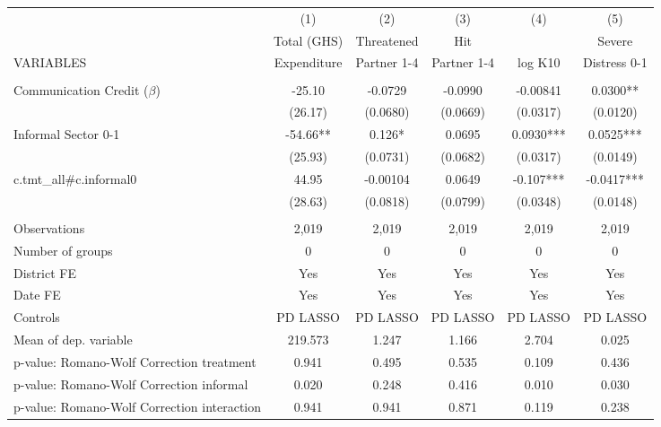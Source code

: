 \begin{tabular}{lccccc} \hline
 & (1) & (2) & (3) & (4) & (5) \\
 & Total (GHS) & Threatened & Hit &  & Severe \\
VARIABLES & Expenditure & Partner 1-4 & Partner 1-4 & log K10 & Distress 0-1 \\ \hline
 &  &  &  &  &  \\
Communication Credit ($\beta$) & -25.10 & -0.0729 & -0.0990 & -0.00841 & 0.0300** \\
 & (26.17) & (0.0680) & (0.0669) & (0.0317) & (0.0120) \\
Informal Sector 0-1 & -54.66** & 0.126* & 0.0695 & 0.0930*** & 0.0525*** \\
 & (25.93) & (0.0731) & (0.0682) & (0.0317) & (0.0149) \\
c.tmt\_all\#c.informal0 & 44.95 & -0.00104 & 0.0649 & -0.107*** & -0.0417*** \\
 & (28.63) & (0.0818) & (0.0799) & (0.0348) & (0.0148) \\
 &  &  &  &  &  \\
Observations & 2,019 & 2,019 & 2,019 & 2,019 & 2,019 \\
Number of groups & 0 & 0 & 0 & 0 & 0 \\
District FE & Yes & Yes & Yes & Yes & Yes \\
Date FE & Yes & Yes & Yes & Yes & Yes \\
Controls & PD LASSO & PD LASSO & PD LASSO & PD LASSO & PD LASSO \\
Mean of dep. variable & 219.573 & 1.247 & 1.166 & 2.704 & 0.025 \\
p-value: Romano-Wolf Correction treatment & 0.941 & 0.495 & 0.535 & 0.109 & 0.436 \\
p-value: Romano-Wolf Correction informal & 0.020 & 0.248 & 0.416 & 0.010 & 0.030 \\
 p-value: Romano-Wolf Correction interaction & 0.941 & 0.941 & 0.871 & 0.119 & 0.238 \\ \hline
\end{tabular}
